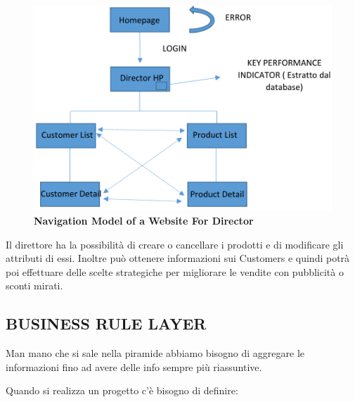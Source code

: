 \begin{center}
\begin{figure}[H]
\centering
\includegraphics[scale=1]{figures/pld.png}
\caption{\textbf{Navigation Model of a Website For Director}}
\end{figure}
\end{center}

Il direttore ha la possibilità di creare o cancellare i prodotti e di modificare gli attributi di essi. Inoltre può ottenere informazioni sui Customers e quindi potrà poi effettuare delle scelte strategiche per migliorare le vendite con pubblicità o sconti mirati. 

\subsection{BUSINESS RULE LAYER}

Man mano che si sale nella piramide abbiamo bisogno di aggregare le informazioni fino ad avere delle info sempre più riassuntive.

Quando si realizza un progetto c’è bisogno di definire: 

